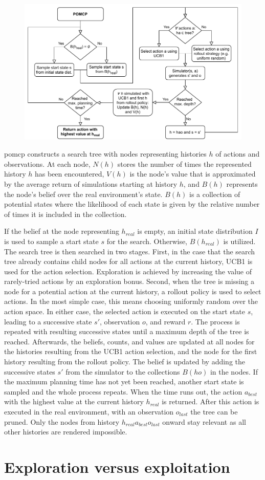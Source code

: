 \begin{figure}[htbp]
    \centerfloat
    \includegraphics[width=1.2\textwidth]{figures/POMCP.pdf}
\end{figure}

\Gls{pomcp} constructs a search tree with nodes representing histories $h$ of actions and observations. At each node, $N(h)$ stores the number of times the represented history $h$ has been encountered, $V(h)$ is the node's value that is approximated by the average return of simulations starting at history $h$, and $B(h)$ represents the node's belief over the real environment's state. $B(h)$ is a collection of potential states where the likelihood of each state is given by the relative number of times it is included in the collection.

If the belief at the node representing $h_{real}$ is empty, an initial state distribution $I$ is used to sample a start state $s$ for the search. Otherwise, $B(h_{real})$ is utilized. The search tree is then searched in two stages. First, in the case that the search tree already contains child nodes for all actions at the current history, UCB1 is used for the action selection. Exploration is achieved by increasing the value of rarely-tried actions by an exploration bonus. Second, when the tree is missing a node for a potential action at the current history, a rollout policy is used to select actions. In the most simple case, this means choosing uniformly random over the action space. In either case, the selected action is executed on the start state $s$, leading to a successive state $s'$, observation $o$, and reward $r$. The process is repeated with resulting successive states until a maximum depth of the tree is reached. Afterwards, the beliefs, counts, and values are updated at all nodes for the histories resulting from the UCB1 action selection, and the node for the first history resulting from the rollout policy. The belief is updated by adding the successive states $s'$ from the simulator to the collections $B(ho)$ in the nodes. If the maximum planning time has not yet been reached, another start state is sampled and the whole process repeats. When the time runs out, the action $a_{best}$ with the highest value at the current history $h_{real}$ is returned. After this action is executed in the real environment, with an observation $o_{last}$ the tree can be pruned. Only the nodes from history $h_{real}a_{best}o_{last}$ onward stay relevant as all other histories are rendered impossible.

\section{Exploration versus exploitation} %